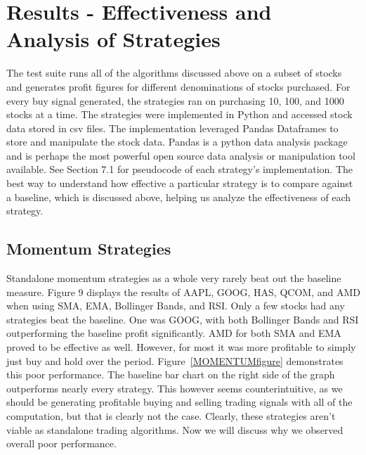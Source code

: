 \documentclass[letterpaper,11pt]{article}
\begin{document}
\FloatBarrier

\section{Results - Effectiveness and Analysis of Strategies}


The test suite runs all of the algorithms discussed above on a subset of stocks and generates profit figures for different denominations of stocks purchased. For every buy signal generated, the strategies ran on purchasing 10, 100, and 1000 stocks at a time. The strategies were implemented in Python and accessed stock data stored in csv files. The implementation leveraged Pandas Dataframes to store and manipulate the stock data. Pandas is a python data analysis package and is perhaps the most powerful open source data analysis or manipulation tool available. See Section 7.1 for pseudocode of each strategy's implementation.  The best way to understand how effective a particular strategy is to compare against a baseline, which is discussed above, helping us analyze the effectiveness of each strategy.   

\subsection{Momentum Strategies}

Standalone momentum strategies as a whole very rarely beat out the baseline measure. Figure 9 displays the results of AAPL, GOOG, HAS, QCOM, and AMD when using SMA, EMA, Bollinger Bands, and RSI. Only a few stocks had any strategies beat the baseline. One was GOOG, with both Bollinger Bands and RSI outperforming the baseline profit significantly. AMD for both SMA and EMA proved to be effective as well. However, for most it was more profitable to simply just buy and hold over the period. Figure~\ref{MOMENTUMfigure} demonstrates this poor performance. The baseline bar chart on the right side of the graph outperforms nearly every strategy. This however seems counterintuitive, as we should be generating profitable buying and selling trading signals with all of the computation, but that is clearly not the case.  Clearly, these strategies aren't viable as standalone trading algorithms. Now we will discuss why we observed overall poor performance.
\end{document}
